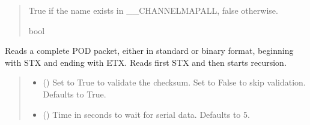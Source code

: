 \documentclass[letterpaper,10pt,english]{sphinxmanual}
\begin{document}
\begin{fulllineitems}
\begin{fulllineitems}
\begin{quote}
\begin{description}
\sphinxAtStartPar
True if the name exists in \_\_CHANNELMAPALL, false otherwise.

\sphinxAtStartPar
bool

\end{description}\end{quote}

\end{fulllineitems}


\begin{fulllineitems}
\label{\detokenize{Morelia.Devices:Morelia.Devices.PodDevice_8401HR.Pod8401HR.ReadPODpacket}}
\pysigstartsignatures
{}
\pysigstopsignatures
\sphinxAtStartPar
Reads a complete POD packet, either in standard or binary format, beginning with STX and         ending with ETX. Reads first STX and then starts recursion.
\begin{quote}\begin{description}
\begin{itemize}
\item {} 
\sphinxAtStartPar
{} (\sphinxstyleliteralemphasis{\sphinxupquote{, }}) \textendash{} Set to True to validate the checksum. Set to False to                 skip validation. Defaults to True.

\item {} 
\sphinxAtStartPar
{} (\sphinxstyleliteralemphasis{\sphinxupquote{|}}\sphinxstyleliteralemphasis{\sphinxupquote{, }}) \textendash{} Time in seconds to wait for serial data.                 Defaults to 5.


\end{itemize}
\end{description}
\end{quote}
\end{fulllineitems}
\end{fulllineitems}
\end{document}
